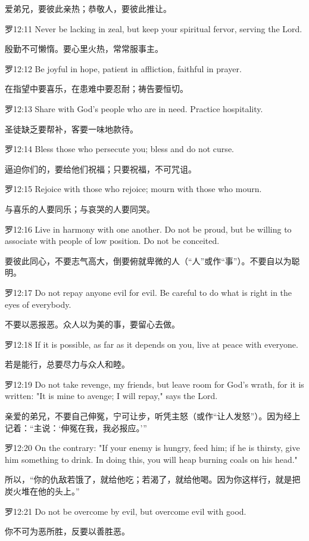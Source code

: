 \documentclass[a4paper,11pt,onecolumn,twoside]{ctexart}
\begin{document}
\begin{multicols}{2}
 爱弟兄，要彼此亲热；恭敬人，要彼此推让。


 罗12:11
 Never be lacking in zeal, but keep your spiritual fervor, serving the Lord.

 殷勤不可懒惰。要心里火热，常常服事主。


 罗12:12
 Be joyful in hope, patient in affliction, faithful in prayer.

 在指望中要喜乐，在患难中要忍耐；祷告要恒切。


 罗12:13
 Share with God's people who are in need. Practice hospitality.

 圣徒缺乏要帮补，客要一味地款待。


 罗12:14
 Bless those who persecute you; bless and do not curse.

 逼迫你们的，要给他们祝福；只要祝福，不可咒诅。


 罗12:15
 Rejoice with those who rejoice; mourn with those who mourn.

 与喜乐的人要同乐；与哀哭的人要同哭。


 罗12:16
 Live in harmony with one another. Do not be proud, but be willing to associate with people of low position. Do not be conceited.

 要彼此同心，不要志气高大，倒要俯就卑微的人（“人”或作“事”）。不要自以为聪明。


 罗12:17
 Do not repay anyone evil for evil. Be careful to do what is right in the eyes of everybody.

 不要以恶报恶。众人以为美的事，要留心去做。


 罗12:18
 If it is possible, as far as it depends on you, live at peace with everyone.

 若是能行，总要尽力与众人和睦。


 罗12:19
 Do not take revenge, my friends, but leave room for God's wrath, for it is written: "It is mine to avenge; I will repay," says the Lord.

 亲爱的弟兄，不要自己伸冤，宁可让步，听凭主怒（或作“让人发怒”）。因为经上记着：“主说：‘伸冤在我，我必报应。’”


 罗12:20
 On the contrary: "If your enemy is hungry, feed him; if he is thirsty, give him something to drink. In doing this, you will heap burning coals on his head."

 所以，“你的仇敌若饿了，就给他吃；若渴了，就给他喝。因为你这样行，就是把炭火堆在他的头上。”


 罗12:21
 Do not be overcome by evil, but overcome evil with good.

 你不可为恶所胜，反要以善胜恶。



\end{multicols}
\end{document}
